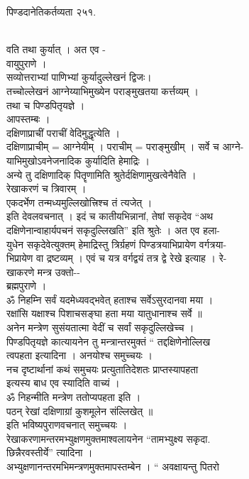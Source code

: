 \documentclass[11pt, openany]{book}
\begin{document}
{{{{{{{{{{{{ }{ पिण्डदानेतिकर्तव्यता २५१.}{\\
वति तथा कुर्यात् । अत एव -\\
वायुपुराणे ।\\
सव्योत्तराभ्यां पाणिभ्यां कुर्यादुल्लेखनं द्विजः।\\
तच्चोल्लेखनं आग्नेय्याभिमुख्येन पराङ्मुखतया कर्त्तव्यम् ।\\
तथा च पिण्डपितृयज्ञे ।\\
आपस्तम्बः ।\\
दक्षिणाप्राचीं पराचीं वेदिमुद्धृत्येति ।\\
दक्षिणाप्राचीम् = आग्नेयीम् । पराचीम् = पराङ्मुखीम् । सर्वे च आग्ने-\\
याभिमुखोऽवनेजनादिक कुर्यादिति हेमाद्रिः ।\\
अन्ये तु दक्षिणादिक् पितॄणामिति श्रुतेर्दक्षिणामुखत्वेनैवेति ।\\
रेखाकरणं च त्रिवारम् ।\\
एकदर्भेण तन्मध्यमुल्लिखोत्त्रिश्च तं त्यजेत् ।\\
इति देवलवचनात् । इदं च कातीयभिन्नानां, तेषां सकृदेव ``अथ\\
दक्षिणेनान्वाहार्यपचनं सकृदुल्लिखति'' इति श्रुतेः । अत एव हला-\\
युधेन सकृदेवेत्युक्तम् हेमाद्रिस्तु त्रिर्ग्रहणं पिण्डत्रयाभिप्रायेण
वर्गत्रया-\\
भिप्रायेण वा द्रष्टव्यम् । एवं च यत्र वर्गद्वयं तत्र द्वे रेखे इत्याह ।
रे-\\
खाकरणे मन्त्र उक्तो-\/-\\
ब्रह्मपुराणे ।\\
ॐ निहम्नि सर्वं यदमेध्यवद्भवेत् हताश्च सर्वेऽसुरदानवा मया ।\\
रक्षांसि यक्षाश्च पिशाचसङ्घा हता मया यातुधानाश्च सर्वे ॥\\
अनेन मन्त्रेण सुसंयतात्मा वेदीं च सर्वां सकृदुल्लिखेच्च ।\\
पिण्डपितृयज्ञे कात्यायनेन तु मन्त्रान्तरमुक्तं `` तद्दक्षिणेनोल्लिख\\
त्वपहता इत्यादिना । अनयोश्च समुच्चयः ।\\
नच दृष्टार्थानां कथं समुचयः प्रत्युतातिदेशतः प्राप्तस्यापहता\\
इत्यस्य बाध एव स्यादिति वाच्यं ।\\
ॐ निहन्मीति मन्त्रेण ततोप्यपहता इति ।\\
पठन् रेखां दक्षिणाग्रां कुशमूलेन संल्लिखेत् ॥\\
इति भविष्यपुराणवचनात् समुच्चयः ।\\
रेखाकरणामन्तरमभ्युक्षणमुक्तमाश्वलायनेन ``तामभ्युक्ष्य सकृदा.\\
छिन्नैरवस्तीर्ये'' त्यादिना ।\\
अभ्युक्षणानन्तरमभिमन्त्रणमुक्तमापस्तम्बेन । `` अवक्षायन्तु पितरो

}}}}}}}}}}}}
\end{document}
